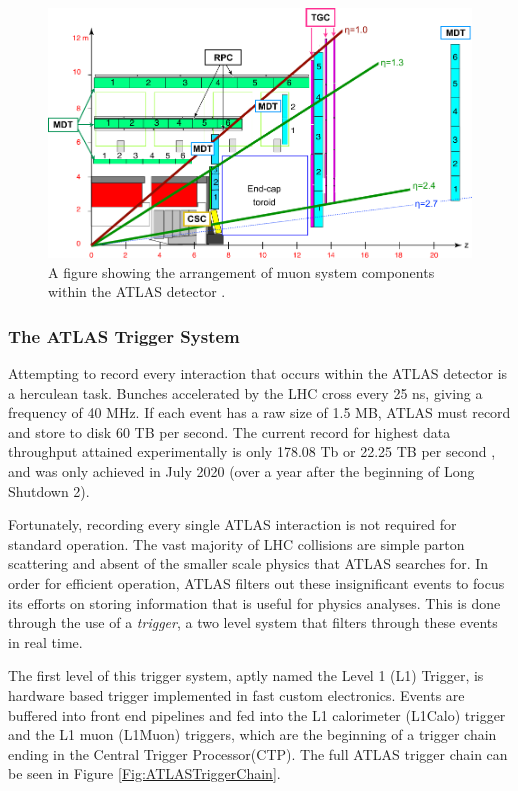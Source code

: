 \documentclass[12pt,a4paper,epsf,portrait,times,epsfig]{article}
\begin{document}
		\begin{figure}
			\centering
			\includegraphics[scale=1.5]{Muon_schematic_transp}
			\caption{A figure showing the arrangement of muon system components within the ATLAS detector \cite{ATLASTriggerImage}.}
			\label{Fig:MuonSystemLayout}
		\end{figure}


		\subsubsection{The ATLAS Trigger System}

		Attempting to record every interaction that occurs within the ATLAS detector is a herculean task. Bunches accelerated by the LHC cross every 25 ns, giving a frequency of 40 MHz. If each event has a raw size of 1.5 MB, ATLAS must record and store to disk 60 TB per second. The current record for highest data throughput attained experimentally is only 178.08 Tb or 22.25 TB per second \cite{UCLThroughput}, and was only achieved in July 2020 (over a year after the beginning of Long Shutdown 2). \par

		Fortunately, recording every single ATLAS interaction is not required for standard operation. The vast majority of LHC collisions are simple parton scattering and absent of the smaller scale physics that ATLAS searches for. In order for efficient operation, ATLAS filters out these insignificant events to focus its efforts on storing information that is useful for physics analyses. This is done through the use of a \textit{trigger}, a two level system that filters through these events in real time. \par

		The first level of this trigger system, aptly named the Level 1 (L1) Trigger, is hardware based trigger implemented in fast custom electronics. Events are buffered into front end pipelines and fed into the L1 calorimeter (L1Calo) trigger and the L1 muon (L1Muon) triggers, which are the beginning of a trigger chain ending in the Central Trigger Processor(CTP). The full ATLAS trigger chain can be seen in Figure \ref{Fig:ATLASTriggerChain}. \par
\end{document}
